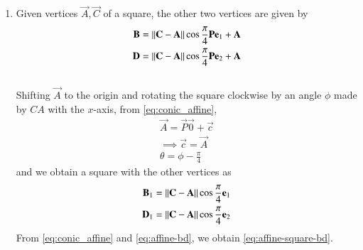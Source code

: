 \begin{enumerate}[label=\thesubsection.\arabic*.,ref=\thesubsection.\theenumi]
\item Given vertices $\vec{A}, \vec{C}$ of a square, the other two vertices are given by
\begin{align}
\begin{split}
	\mathbf{B} = \left\lVert\mathbf{C}-\mathbf{A}\right\rVert\cos \frac{\pi}{4}\mathbf{P}\mathbf{e}_1+\mathbf{A}
	\\
	\mathbf{D} = \left\lVert\mathbf{C}-\mathbf{A}\right\rVert\cos \frac{\pi}{4}\mathbf{P}\mathbf{e}_2+\mathbf{A}
\end{split}
	\label{eq:affine-square-bd}
\end{align}
	\\
		\solution Shifting $\vec{A}$ to the origin and rotating the square clockwise by an angle $\phi$ made by $CA$ with the $x$-axis,
	from \eqref{eq:conic_affine},
\begin{align}
\vec{A} = \vec{P}\vec{0}+\vec{c}
\\
\implies 
\vec{c} = \vec{A}
\\
	\theta =  \phi -\frac{\pi}{4} 
\end{align}
and we obtain a square with the other vertices as
\begin{align}
\begin{split}
	\mathbf{B}_1 = \left\lVert\mathbf{C}-\mathbf{A}\right\rVert\cos \frac{\pi}{4}\mathbf{e}_1
	\\
	\mathbf{D}_1 = \left\lVert\mathbf{C}-\mathbf{A}\right\rVert\cos \frac{\pi}{4}\mathbf{e}_2
\end{split}
	\label{eq:affine-bd}
\end{align}
	From \eqref{eq:conic_affine}
	and 
	\eqref{eq:affine-bd},
	we obtain \eqref{eq:affine-square-bd}.
\end{enumerate}
